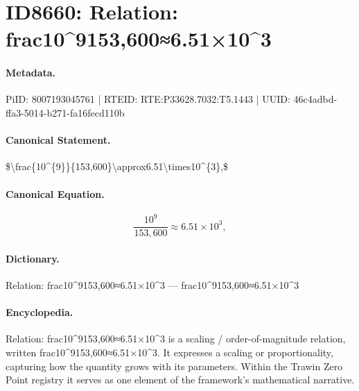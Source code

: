 \section*{ID8660: Relation: frac10\textasciicircum{}9153,600≈6.51×10\textasciicircum{}3}
\paragraph{Metadata.}
PiID: 8007193045761 | RTEID: RTE:P33628.7032:T5.1443 | UUID: 46c4adbd-ffa3-5014-b271-fa16fecd110b

\paragraph{Canonical Statement.}
\$\textbackslash{}frac\{10\textasciicircum{}\{9\}\}\{153,600\}\textbackslash{}approx6.51\textbackslash{}times10\textasciicircum{}\{3\},\$

\paragraph{Canonical Equation.}
\[
\frac{10^{9}}{153,600}\approx6.51\times10^{3},
\]

\paragraph{Dictionary.}
Relation: frac10\textasciicircum{}9153,600≈6.51×10\textasciicircum{}3 — frac10\textasciicircum{}9153,600≈6.51×10\textasciicircum{}3

\paragraph{Encyclopedia.}
Relation: frac10\textasciicircum{}9153,600≈6.51×10\textasciicircum{}3 is a scaling / order-of-magnitude relation, written frac10\textasciicircum{}9153,600≈6.51×10\textasciicircum{}3. It expresses a scaling or proportionality, capturing how the quantity grows with its parameters. Within the Trawin Zero Point registry it serves as one element of the framework's mathematical narrative.
